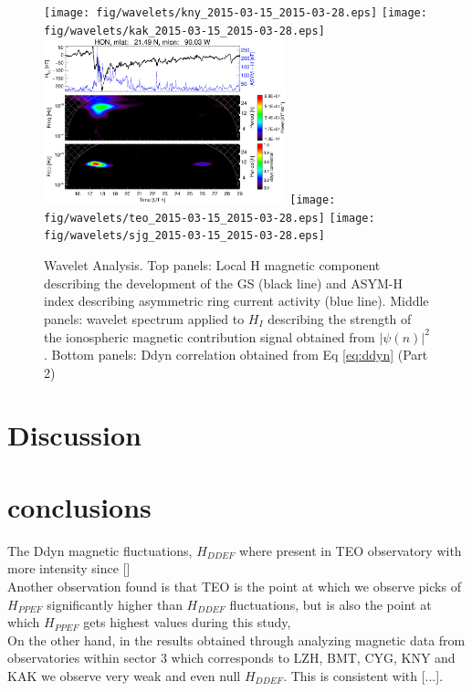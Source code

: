 \documentclass[a4paper]{article}
\theoremstyle{plain}
\theoremstyle{definition}
\begin{document}
\begin{figure}
	\ContinuedFloat %
	\centering

	\texttt{[image: fig/wavelets/kny\_2015-03-15\_2015-03-28.eps]}  
	\texttt{[image: fig/wavelets/kak\_2015-03-15\_2015-03-28.eps]}
	\includegraphics[width=7.0cm]{fig/wavelets/hon_2015-03-15_2015-03-28.eps}
	\texttt{[image: fig/wavelets/teo\_2015-03-15\_2015-03-28.eps]}
	\texttt{[image: fig/wavelets/sjg\_2015-03-15\_2015-03-28.eps]}
	
	\caption{Wavelet Analysis. Top panels: Local H magnetic component describing the development of the GS (black line) and ASYM-H index describing asymmetric ring current activity (blue line). Middle panels: wavelet spectrum applied to $H_I$ describing the strength of the ionospheric magnetic contribution signal obtained from $|\psi(n)|^2$. Bottom panels: Ddyn correlation obtained from Eq \ref{eq:ddyn}  (Part 2)}
\end{figure}



	
	\section{Discussion}
	
	\section{conclusions}
	
	The Ddyn magnetic fluctuations, $H_{DDEF}$ where present in TEO observatory with more intensity since []\\
	
	Another observation found is that TEO is the point at which we observe picks of $H_{PPEF}$ significantly higher than $H_{DDEF}$ fluctuations, but is also the point at which $H_{PPEF}$ gets highest values during this study,\\
	
	On the other hand, in the results obtained through analyzing magnetic data from observatories within sector 3 which corresponds to LZH, BMT, CYG, KNY and KAK we observe very weak and even null $H_{DDEF}$. This is consistent with [...].\\
	
\end{document}
